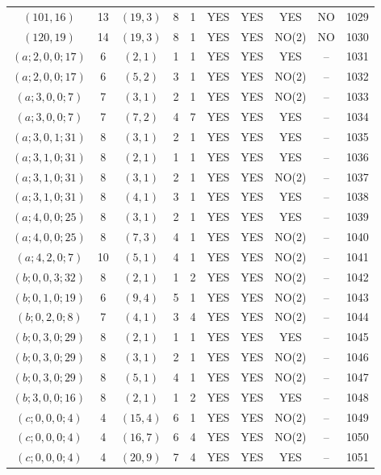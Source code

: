 \begin{longtable}{|c|c|c|c|c|c|c|c|c|c|}
$(101, 16)$ & 13 & $(19, 3)$ & 8 & 1 & YES & YES & YES & NO & 1029\\
$(120, 19)$ & 14 & $(19, 3)$ & 8 & 1 & YES & YES & NO(2) & NO & 1030\\
$(a; 2, 0, 0; 17)$ & 6 & $(2, 1)$ & 1 & 1 & YES & YES & YES & -- & 1031\\
$(a; 2, 0, 0; 17)$ & 6 & $(5, 2)$ & 3 & 1 & YES & YES & NO(2) & -- & 1032\\
$(a; 3, 0, 0; 7)$ & 7 & $(3, 1)$ & 2 & 1 & YES & YES & NO(2) & -- & 1033\\
$(a; 3, 0, 0; 7)$ & 7 & $(7, 2)$ & 4 & 7 & YES & YES & YES & -- & 1034\\
$(a; 3, 0, 1; 31)$ & 8 & $(3, 1)$ & 2 & 1 & YES & YES & YES & -- & 1035\\
$(a; 3, 1, 0; 31)$ & 8 & $(2, 1)$ & 1 & 1 & YES & YES & YES & -- & 1036\\
$(a; 3, 1, 0; 31)$ & 8 & $(3, 1)$ & 2 & 1 & YES & YES & NO(2) & -- & 1037\\
$(a; 3, 1, 0; 31)$ & 8 & $(4, 1)$ & 3 & 1 & YES & YES & YES & -- & 1038\\
$(a; 4, 0, 0; 25)$ & 8 & $(3, 1)$ & 2 & 1 & YES & YES & YES & -- & 1039\\
$(a; 4, 0, 0; 25)$ & 8 & $(7, 3)$ & 4 & 1 & YES & YES & NO(2) & -- & 1040\\
$(a; 4, 2, 0; 7)$ & 10 & $(5, 1)$ & 4 & 1 & YES & YES & NO(2) & -- & 1041\\
$(b; 0, 0, 3; 32)$ & 8 & $(2, 1)$ & 1 & 2 & YES & YES & NO(2) & -- & 1042\\
$(b; 0, 1, 0; 19)$ & 6 & $(9, 4)$ & 5 & 1 & YES & YES & NO(2) & -- & 1043\\
$(b; 0, 2, 0; 8)$ & 7 & $(4, 1)$ & 3 & 4 & YES & YES & NO(2) & -- & 1044\\
$(b; 0, 3, 0; 29)$ & 8 & $(2, 1)$ & 1 & 1 & YES & YES & YES & -- & 1045\\
$(b; 0, 3, 0; 29)$ & 8 & $(3, 1)$ & 2 & 1 & YES & YES & NO(2) & -- & 1046\\
$(b; 0, 3, 0; 29)$ & 8 & $(5, 1)$ & 4 & 1 & YES & YES & NO(2) & -- & 1047\\
$(b; 3, 0, 0; 16)$ & 8 & $(2, 1)$ & 1 & 2 & YES & YES & YES & -- & 1048\\
$(c; 0, 0, 0; 4)$ & 4 & $(15, 4)$ & 6 & 1 & YES & YES & NO(2) & -- & 1049\\
$(c; 0, 0, 0; 4)$ & 4 & $(16, 7)$ & 6 & 4 & YES & YES & NO(2) & -- & 1050\\
$(c; 0, 0, 0; 4)$ & 4 & $(20, 9)$ & 7 & 4 & YES & YES & YES & -- & 1051\\

\end{longtable}
